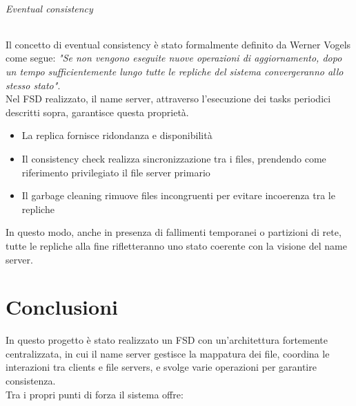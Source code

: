 \documentclass[a4paper, 12pt]{scrreprt}
\begin{document}
            \subparagraph{Eventual consistency}

                Il concetto di eventual consistency è stato formalmente definito da Werner Vogels come segue: \textit{"Se non vengono eseguite nuove operazioni di aggiornamento, dopo un tempo sufficientemente lungo tutte le repliche del sistema convergeranno allo stesso stato"}.\\
                Nel FSD realizzato, il name server, attraverso l'esecuzione dei tasks periodici descritti sopra, garantisce questa proprietà.

                \begin{itemize}

                    \item La replica fornisce ridondanza e disponibilità

                    \item Il consistency check realizza sincronizzazione tra i files, prendendo come riferimento privilegiato il file server primario

                    \item Il garbage cleaning rimuove files incongruenti per evitare incoerenza tra le repliche

                \end{itemize}

                In questo modo, anche in presenza di fallimenti temporanei o partizioni di rete, tutte le repliche alla fine rifletteranno uno stato coerente con la visione del name server.

    \chapter{Conclusioni}

        In questo progetto è stato realizzato un FSD con un’architettura fortemente centralizzata, in cui il name server gestisce la mappatura dei file, coordina le interazioni tra clients e file servers, e svolge varie operazioni per garantire consistenza.\\
        Tra i propri punti di forza il sistema offre:
\end{document}
